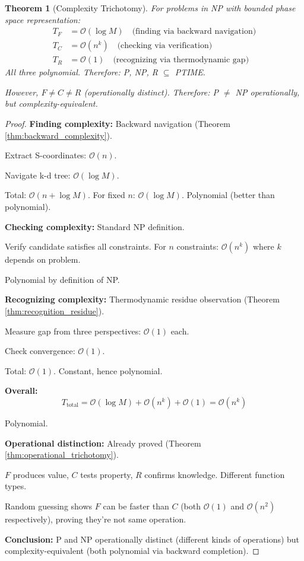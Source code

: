 \documentclass[twocolumn,10pt]{revtex4-2}
\newtheorem{theorem}{Theorem}[section]
\theoremstyle{definition}
\theoremstyle{remark}
\newcommand{\bigO}{\mathcal{O}}
\begin{document}
\begin{theorem}[Complexity Trichotomy]
\label{thm:pnp_resolution}
For problems in NP with bounded phase space representation:
\begin{align}
T_F &= \bigO(\log M) \quad \text{(finding via backward navigation)} \\
T_C &= \bigO(n^k) \quad \text{(checking via verification)} \\
T_R &= \bigO(1) \quad \text{(recognizing via thermodynamic gap)}
\end{align}
All three polynomial. Therefore: P, NP, R $\subseteq$ PTIME.

However, $F \neq C \neq R$ (operationally distinct). Therefore: P $\neq$ NP operationally, but complexity-equivalent.
\end{theorem}

\begin{proof}
\textbf{Finding complexity:} Backward navigation (Theorem \ref{thm:backward_complexity}).

Extract S-coordinates: $\bigO(n)$.

Navigate k-d tree: $\bigO(\log M)$.

Total: $\bigO(n + \log M)$. For fixed $n$: $\bigO(\log M)$. Polynomial (better than polynomial).

\vspace{0.2cm}
\noindent\textbf{Checking complexity:} Standard NP definition.

Verify candidate satisfies all constraints. For $n$ constraints: $\bigO(n^k)$ where $k$ depends on problem.

Polynomial by definition of NP.

\vspace{0.2cm}
\noindent\textbf{Recognizing complexity:} Thermodynamic residue observation (Theorem \ref{thm:recognition_residue}).

Measure gap from three perspectives: $\bigO(1)$ each.

Check convergence: $\bigO(1)$.

Total: $\bigO(1)$. Constant, hence polynomial.

\vspace{0.2cm}
\noindent\textbf{Overall:}
\begin{equation}
T_{\text{total}} = \bigO(\log M) + \bigO(n^k) + \bigO(1) = \bigO(n^k)
\end{equation}

Polynomial.

\vspace{0.2cm}
\noindent\textbf{Operational distinction:} Already proved (Theorem \ref{thm:operational_trichotomy}).

$F$ produces value, $C$ tests property, $R$ confirms knowledge. Different function types.

Random guessing shows $F$ can be faster than $C$ (both $\bigO(1)$ and $\bigO(n^2)$ respectively), proving they're not same operation.

\vspace{0.2cm}
\noindent\textbf{Conclusion:} P and NP operationally distinct (different kinds of operations) but complexity-equivalent (both polynomial via backward completion).
\end{proof}
\end{document}
